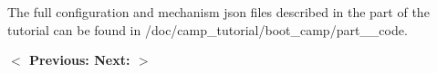 The full configuration and mechanism {\ttfamily json} files described in the part of the tutorial can be found in {\ttfamily /doc/camp\+\_\+tutorial/boot\+\_\+camp/part\+\_\+\_\+code}.

 {\bfseries{ \texorpdfstring{$<$}{<} Previous\+: }}     {\bfseries{ Next\+: }}  {\bfseries{ \texorpdfstring{$>$}{>} }} 